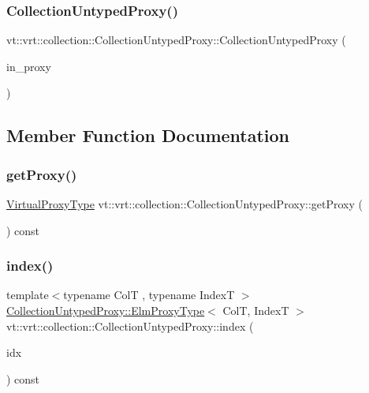 \subsubsection{\texorpdfstring{Collection\+Untyped\+Proxy()}{CollectionUntypedProxy()}\hspace{0.1cm}{\footnotesize\ttfamily [2/2]}}
{\footnotesize\ttfamily vt\+::vrt\+::collection\+::\+Collection\+Untyped\+Proxy\+::\+Collection\+Untyped\+Proxy (\begin{DoxyParamCaption}\item[{\hyperlink{namespacevt_a1b417dd5d684f045bb58a0ede70045ac}{Virtual\+Proxy\+Type} const}]{in\+\_\+proxy }\end{DoxyParamCaption})}



\subsection{Member Function Documentation}
\mbox{\label{structvt_1_1vrt_1_1collection_1_1_collection_untyped_proxy_a4ccee923016e883cd6b131d2ffc156b6}} 
\subsubsection{\texorpdfstring{get\+Proxy()}{getProxy()}}
{\footnotesize\ttfamily \hyperlink{namespacevt_a1b417dd5d684f045bb58a0ede70045ac}{Virtual\+Proxy\+Type} vt\+::vrt\+::collection\+::\+Collection\+Untyped\+Proxy\+::get\+Proxy (\begin{DoxyParamCaption}{ }\end{DoxyParamCaption}) const}

\mbox{\label{structvt_1_1vrt_1_1collection_1_1_collection_untyped_proxy_a374fa73d81e8cf2fff9f2b9a494db3c8}} 
\subsubsection{\texorpdfstring{index()}{index()}}
{\footnotesize\ttfamily template$<$typename ColT , typename IndexT $>$ \\
\hyperlink{structvt_1_1vrt_1_1collection_1_1_collection_untyped_proxy_abf73984f3a31218515f9f4806f41cef5}{Collection\+Untyped\+Proxy\+::\+Elm\+Proxy\+Type}$<$ ColT, IndexT $>$ vt\+::vrt\+::collection\+::\+Collection\+Untyped\+Proxy\+::index (\begin{DoxyParamCaption}\item[{IndexT const \&}]{idx }\end{DoxyParamCaption}) const}

